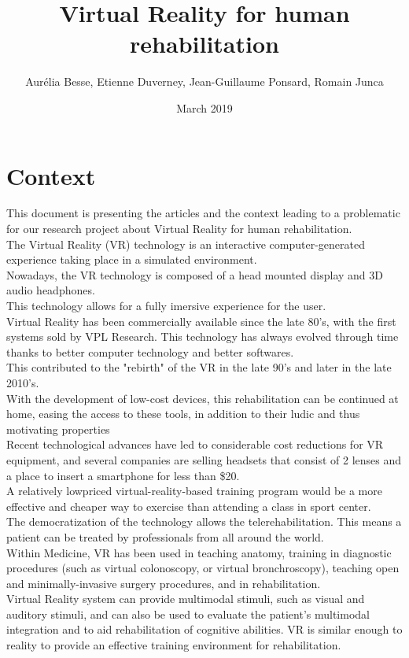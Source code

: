 \documentclass{article}
\title{Virtual Reality for human rehabilitation}
\author{ Aurélia Besse, Etienne Duverney, Jean-Guillaume Ponsard, Romain Junca }
\date{March 2019}
\begin{document}
\maketitle

\section{Context} 
\hspace{0.5cm}
This document is presenting the articles and the context leading to a problematic for our research project about Virtual Reality for human rehabilitation.
\\

The Virtual Reality (VR) technology is an interactive computer-generated experience taking place in a simulated environment. 
\\
Nowadays, the VR technology is composed of a head mounted display and 3D audio headphones.
\\
This technology allows for a fully imersive experience for the user.
\\

Virtual Reality has been commercially available since the late 80's, with the first systems sold by VPL Research.
This technology has always evolved through time thanks to better computer technology and better softwares.
\\
This contributed to the "rebirth" of the VR in the late 90's and later in the late 2010's.
\\


With the development of low-cost devices, this rehabilitation can be continued at home, easing the access to these tools, in addition to their ludic and thus motivating properties
\\ Recent technological advances have led to considerable cost reductions for VR equipment, and several companies are selling headsets that consist of 2 lenses and a place to insert a smartphone for less than \$20.
\\ A relatively lowpriced virtual-reality-based training program would be a more effective and cheaper way to exercise than attending a class in sport center.
\\ The democratization of the technology allows the telerehabilitation. This means a patient can be treated by professionals from all around the world. 
\\

Within Medicine, VR has been used in teaching anatomy, training in diagnostic procedures (such as virtual colonoscopy, or virtual bronchroscopy), teaching open and minimally-invasive surgery procedures, and in rehabilitation. \\
Virtual Reality system can provide multimodal stimuli, such as visual and auditory stimuli, and can also be used to evaluate the patient’s multimodal integration and to aid rehabilitation of cognitive abilities. 
VR is similar enough to reality to provide an effective training environment for rehabilitation. \\
\end{document}
